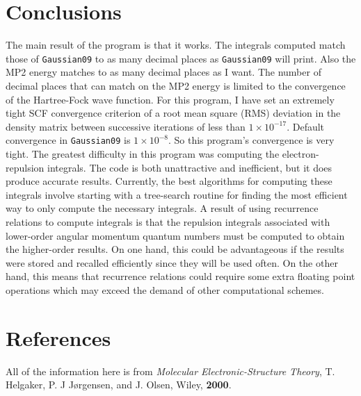 \documentclass[12pt]{article}
\begin{document}
\section{Conclusions}
The main result of the program is that it works. The integrals computed match
those of {\tt Gaussian09} to as many decimal places as {\tt Gaussian09} will print.
Also the MP2 energy matches to as many decimal places as I want. The number
of decimal places that can match on the MP2 energy is limited to the convergence
of the Hartree-Fock wave function. For this program, I have set an extremely tight
SCF convergence criterion of a root mean square (RMS) deviation in the density matrix
between successive iterations of less than $1\times10^{-17}$.
Default convergence in {\tt Gaussian09} is $1\times 10^{-8}$. So this program's
convergence is very tight. The greatest difficulty in this program was computing
the electron-repulsion integrals. The code is both unattractive and inefficient, but
it does produce accurate results. Currently, the best algorithms for computing these
integrals involve starting with a tree-search routine for finding the most efficient way to
only compute the necessary integrals. A result of using recurrence relations to
compute integrals is that the repulsion integrals associated with lower-order
angular momentum quantum numbers must be computed to obtain the higher-order
results. On one hand, this could be advantageous if the results were stored and
recalled efficiently since they will be used often. On the other hand, this means
that recurrence relations could require some extra floating point operations which may
exceed the demand of other computational schemes.  

\section{References}
All of the information here is from \emph{Molecular Electronic-Structure
Theory}, T. Helgaker, P. J J{\o}rgensen, and J. Olsen, Wiley, {\bf 2000}.
\end{document}
